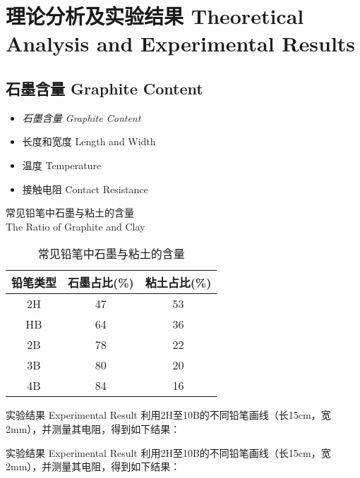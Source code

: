 \documentclass[10pt]{beamer}
\begin{document}
	
	\section{理论分析及实验结果 Theoretical Analysis and Experimental Results }
	\subsection{石墨含量 Graphite Content}
	
	
	\begin{frame}%
		\begin{itemize}
			\item {\LARGE \textit{石墨含量 Graphite Content}}
			\item 长度和宽度 Length and Width
			
			\item 温度 Temperature
			\item 接触电阻 Contact Resistance
		\end{itemize}
	\end{frame}
	
	
	\begin{frame}{常见铅笔中石墨与粘土的含量 \\The Ratio of Graphite and Clay}
		\begin{table}[htp]
			\caption{常见铅笔中石墨与粘土的含量}
			\centering
			\begin{tabular}{||c|c|c||}
				\hline
				铅笔类型&石墨占比(\%)&粘土占比(\%) \\ 
				\hline 
				2H&47  &53  \\ 
				\hline 
				HB&64  &36  \\ 
				\hline 
				2B&78  &22  \\ 
				\hline 
				3B&80  &20  \\ 
				\hline 
				4B&84  &16  \\ 
				\hline 
			\end{tabular} 
		\end{table}
		\pause
		
	\end{frame}
	
	\begin{frame}{实验结果 Experimental Result}
		利用2H至10B的不同铅笔画线（长15cm，宽2mm），并测量其电阻，得到如下结果：
		
	\end{frame}
	
	
	\begin{frame}{实验结果 Experimental Result}
		利用2H至10B的不同铅笔画线（长15cm，宽2mm），并测量其电阻，得到如下结果：
		
	\end{frame}
	
\end{document}
